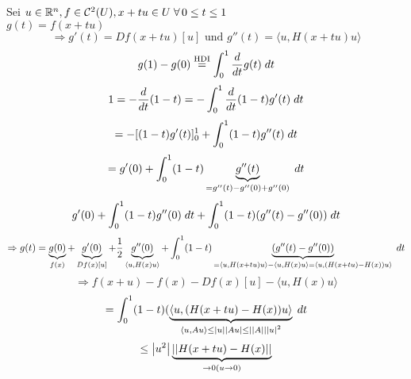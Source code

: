\documentclass[../ana2.tex]{subfiles}
\begin{document}
\begin{bew}
    Sei \(u \in \R^n, f \in \mathcal{C}^2(U), x+tu \in U \; \forall 0 \leq t \leq 1\)\\
    \(g(t) = f(x+tu) \) \\
    \[ \Rightarrow g'(t) = Df(x+tu)[u] \text{ und } g''(t) = \langle u, H(x+tu)u \rangle \tag{*} \]
    \[ g(1) - g(0) \oversett{HDI}{=} \integralx{\ddx{t}g(t)}{0}{1}{t} \]
    \[ 1 = - \ddx{t}(1-t) = -\integralx{\ddx{t} (1-t)g'(t)}{0}{1}{t} \]
    \[ = - [(1-t)g'(t)]_0^1 + \integralx{(1-t)g''(t)}{0}{1}{t} \]
    \[ = g'(0) + \integralx{(1-t) \underbrace{g''(t)}_{= g''(t)-g''(0)+g''(0)}}{0}{1}{t} \]
    \[ g'(0) + \integralx{(1-t)g''(0)}{0}{1}{t} + \integralx{(1-t)(g''(t)- g''(0))}{0}{1}{t} \]
    \[ \Rightarrow g(t) = \underbrace{g(0)}_{f(x)} + \underbrace{g'(0)}_{Df(x)[u]} + \frac{1}{2} 
    \underbrace{g''(0)}_{\langle u, H(x)u \rangle} + \integralx{(1-t)
    \underbrace{(g''(t)-g''(0))}_{=\langle u, H(x+tu)u \rangle - \langle u, H(x)u \rangle
    \\=\langle u, (H(x+tu)-H(x))u \rangle}}{0}{1}{t} \]
    \[ \Rightarrow f(x+u) - f(x)- Df(x)[u] - \langle u,H(x)u \rangle \]
    \[ = \integralx{(1-t)(\underbrace{\langle u, (H(x+tu)-H(x))u \rangle}
    _{\langle u, Au \rangle \leq \abs{u}\abs{Au} \leq \norm{A}\abs{u}^2 }}{0}{1}{t} \]
    \[ \leq \abs{u^2} \underbrace{\norm{H(x+tu)-H(x)}}_{\rightarrow 0 (u \rightarrow 0)} \]
\end{bew}
\end{document}
